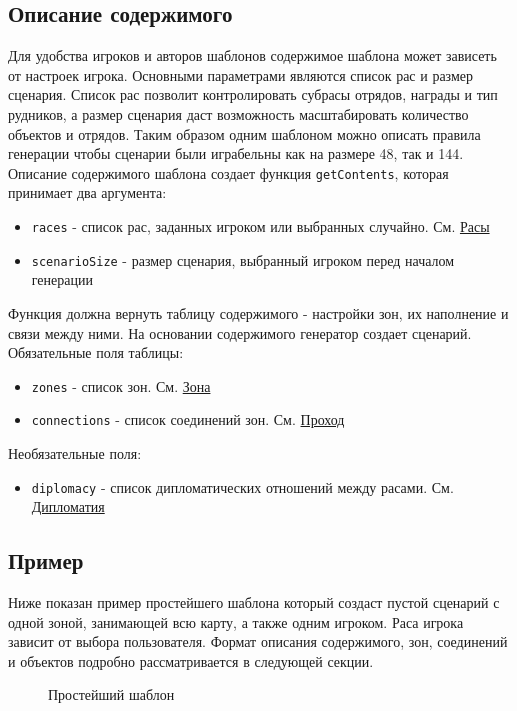\subsection{Описание содержимого}
\label{contentsTable}
Для удобства игроков и авторов шаблонов содержимое шаблона может зависеть от настроек игрока. Основными параметрами являются список рас и размер сценария.
Список рас позволит контролировать субрасы отрядов, награды и тип рудников, а размер сценария даст возможность масштабировать количество объектов и отрядов.
Таким образом одним шаблоном можно описать правила генерации чтобы сценарии были играбельны как на размере 48, так и 144.\\
Описание содержимого шаблона создает функция \texttt{getContents}, которая принимает два аргумента:
\begin{itemize}
\item \texttt{races} - список рас, заданных игроком или выбранных случайно. См. \hyperref[raceTypes]{Расы}
\item \texttt{scenarioSize} - размер сценария, выбранный игроком перед началом генерации
\end{itemize}
Функция должна вернуть таблицу содержимого - настройки зон, их наполнение и связи между ними. На основании содержимого генератор создает сценарий.\\
Обязательные поля таблицы:
\begin{itemize}
\item \texttt{zones} - список зон. См. \hyperref[zone]{Зона}
\item \texttt{connections} - список соединений зон. См. \hyperref[connection]{Проход}
\end{itemize}
Необязательные поля:
\begin{itemize}
\item \texttt{diplomacy} - список дипломатических отношений между расами. См. \hyperref[diplomacy]{Дипломатия}
\end{itemize}

\subsection{Пример}
Ниже показан пример простейшего шаблона который создаст пустой сценарий с одной зоной, занимающей всю карту, а также одним игроком. Раса игрока зависит от выбора пользователя.
Формат описания содержимого, зон, соединений и объектов подробно рассматривается в следующей секции.
\begin{figure}[H]

\caption{Простейший шаблон}
\end{figure}